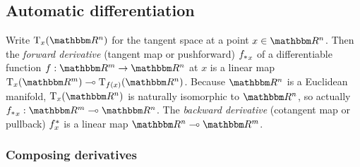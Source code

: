 \subsection{Automatic differentiation}

Write $\tangents_x(\RR^n)$ for the tangent space at a point $x \in \RR^n$. Then the \emph{forward derivative}
(tangent map or pushforward) ${f_{*}}_x$ of a differentiable function $f: \RR^m \to \RR^n$ at $x$ is a
linear map $\tangents_x(\RR^m) \linearto \tangents_{f(x)}(\RR^n)$. Because $\RR^n$ is a Euclidean manifold,
$\tangents_x(\RR^n)$ is naturally isomorphic to $\RR^n$, so actually ${\pushf{f}}_x: \RR^m \linearto \RR^n$.
The \emph{backward derivative} (cotangent map or pullback) $f^{*}_x$  is a linear map $\RR^n \linearto
\RR^m$.

\subsubsection{Composing derivatives}
